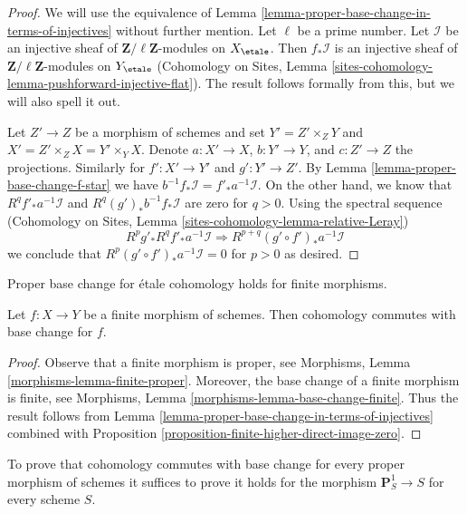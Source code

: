 \begin{proof}
We will use the equivalence of
Lemma \ref{lemma-proper-base-change-in-terms-of-injectives}
without further mention. Let $\ell$ be a prime number.
Let $\mathcal{I}$ be an injective sheaf of
$\mathbf{Z}/\ell\mathbf{Z}$-modules on $X_\etale$.
Then $f_*\mathcal{I}$ is an injective sheaf of
$\mathbf{Z}/\ell\mathbf{Z}$-modules on $Y_\etale$
(Cohomology on Sites, Lemma
\ref{sites-cohomology-lemma-pushforward-injective-flat}).
The result follows formally from this, but we will also
spell it out.

\medskip\noindent
Let $Z' \to Z$ be a morphism of schemes and set
$Y' = Z' \times_Z Y$ and $X' = Z' \times_Z X = Y' \times_ Y X$.
Denote $a : X' \to X$, $b : Y' \to Y$, and $c : Z' \to Z$ the
projections. Similarly for $f' : X' \to Y'$ and $g' : Y' \to Z'$.
By Lemma \ref{lemma-proper-base-change-f-star} we have
$b^{-1}f_*\mathcal{I} = f'_*a^{-1}\mathcal{I}$.
On the other hand, we know that $R^qf'_*a^{-1}\mathcal{I}$ and
$R^q(g')_*b^{-1}f_*\mathcal{I}$ are zero for $q > 0$.
Using the spectral sequence
(Cohomology on Sites, Lemma \ref{sites-cohomology-lemma-relative-Leray})
$$
R^pg'_* R^qf'_* a^{-1}\mathcal{I} \Rightarrow
R^{p + q}(g' \circ f')_* a^{-1}\mathcal{I}
$$
we conclude that $R^p(g' \circ f')_*a^{-1}\mathcal{I} = 0$ for
$p > 0$ as desired.
\end{proof}

\begin{lemma}
\label{lemma-finite}
\begin{slogan}
Proper base change for \'etale cohomology holds for finite morphisms.
\end{slogan}
Let $f : X \to Y$ be a finite morphism of schemes.
Then cohomology commutes with base change for $f$.
\end{lemma}

\begin{proof}
Observe that a finite morphism is proper, see
Morphisms, Lemma \ref{morphisms-lemma-finite-proper}.
Moreover, the base change of a finite morphism is finite, see
Morphisms, Lemma \ref{morphisms-lemma-base-change-finite}.
Thus the result follows from
Lemma \ref{lemma-proper-base-change-in-terms-of-injectives}
combined with
Proposition \ref{proposition-finite-higher-direct-image-zero}.
\end{proof}

\begin{lemma}
\label{lemma-reduce-to-P1}
To prove that cohomology commutes with base change for
every proper morphism of schemes it suffices to prove it
holds for the morphism $\mathbf{P}^1_S \to S$ for every scheme $S$.
\end{lemma}

